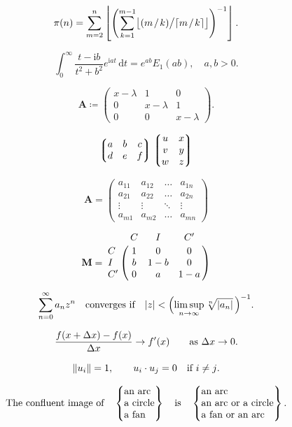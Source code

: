 \documentclass[11pt, a4paper, oneside]{article}
\newcommand{\mathup}[1]{\mathrm{#1}}
\newcommand*{\divslash}{%
	\mathbin{%
		\nonscript\mskip-2mu / \nonscript\mskip-2mu%
	}%
}  %
\theoremstyle{Plain}
\theoremstyle{Definition}
\theoremstyle{Remark}
\begin{document}
\begin{appendix}


	$$\pi(n)=\sum_{m=2}^n\left\lfloor\Biggl(\sum_{k=1}^{m-1}\bigl
	\lfloor(m \divslash k) \big/ \lceil m \divslash k\rceil\bigr\rfloor\Biggr)^{-1}\right\rfloor.$$


	$$\int_0^\infty \frac{t - \mathup{i} b}{t^2 + b^2}e^{\mathup{i}at}\,\mathup{d}t=e^{ab}E_1(ab), \quad
	a,b > 0.$$


	$$\mathbf{A} \coloneq \begin{pmatrix}x-\lambda&1&0\\
	0&x-\lambda&1\\
	0&0&x-\lambda\end{pmatrix}.$$

	$$\left\lgroup\begin{matrix}a&b&c\\ d&e&f\\\end{matrix}\right\rgroup
	\left\lgroup\begin{matrix}u&x\cr v&y\cr w&z\end{matrix}\right\rgroup$$


	$$\mathbf{A} = \begin{pmatrix}a_{11}&a_{12}&\ldots&a_{1n}\\
	a_{21}&a_{22}&\ldots&a_{2n}\\
	\vdots&\vdots&\ddots&\vdots\\
	a_{m1}&a_{m2}&\ldots&a_{mn}\end{pmatrix}$$

	$$\mathbf{M}=\bordermatrix{&C&I&C'\cr
		C&1&0&0\cr I&b&1-b&0\cr C'&0&a&1-a}$$


	$$\sum_{n=0}^\infty a_nz^n\quad\hbox{converges if}\quad
	|z|<\Bigl(\limsup_{n\to\infty}\root n\of{|a_n|}\,\Bigr)^{-1}.$$

	$$\frac{f(x+\mathup{\Delta} x)-f(x)}{\mathup{\Delta} x}\to f'(x)
	\qquad \hbox{as $\mathup{\Delta} x\to0$.}$$

	$$\|u_i\|=1,\qquad u_i\cdot u_j=0\quad\hbox{if $i\ne j$.}$$


	$$\hbox{The confluent image of}\quad
	\begin{Bmatrix}\hbox{an arc}\hfill\\\hbox{a circle}\hfill\\
	\hbox{a fan}\hfill\\\end{Bmatrix}
	\quad\hbox{is}\quad
	\begin{Bmatrix}\hbox{an arc}\hfill\\
	\hbox{an arc or a circle}\hfill\\
	\hbox{a fan or an arc}\hfill\end{Bmatrix}.$$


\end{appendix}
\end{document}
